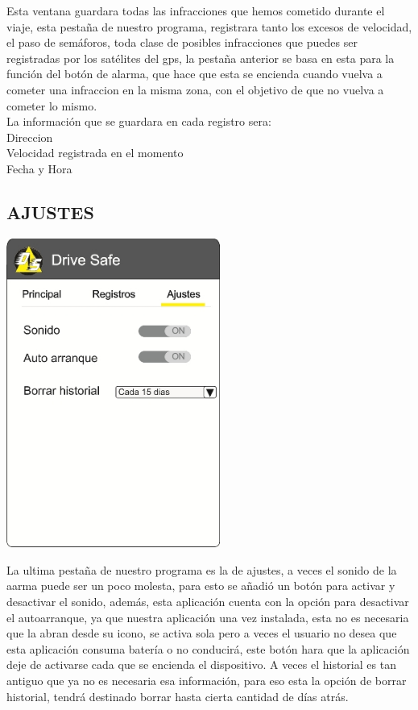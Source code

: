 \documentclass[12pt]{extbook}
\begin{document}
Esta ventana guardara todas las infracciones que hemos cometido durante
el viaje, esta pestaña de nuestro programa, registrara tanto los excesos
de velocidad, el paso de semáforos, toda clase de posibles infracciones
que puedes ser registradas por los satélites del gps, la pestaña anterior
se basa en esta para la función del botón de alarma, que hace que
esta se encienda cuando vuelva a cometer una infraccion en la misma
zona, con el objetivo de que no vuelva a cometer lo mismo.\\

La información que se guardara en cada registro sera: \\

\textbullet{} Direccion\\

\textbullet{} Velocidad registrada en el momento\\

\textbullet{} Fecha y Hora \\

\begin{center}
\subsection*{AJUSTES}
\end{center}

\begin{center}
\includegraphics[width=7cm]{ajustes.jpg}
\end{center}

La ultima pestaña de nuestro programa es la de ajustes, a veces el
sonido de la aarma puede ser un poco molesta, para esto se añadió
un botón para activar y desactivar el sonido, además, esta aplicación
cuenta con la opción para desactivar el autoarranque, ya que nuestra
aplicación una vez instalada, esta no es necesaria que la abran desde
su icono, se activa sola pero a veces el usuario no desea que esta
aplicación consuma batería o no conducirá, este botón hara que la
aplicación deje de activarse cada que se encienda el dispositivo.
A veces el historial es tan antiguo que ya no es necesaria esa información,
para eso esta la opción de borrar historial, tendrá destinado borrar
hasta cierta cantidad de días atrás.
\end{document}
